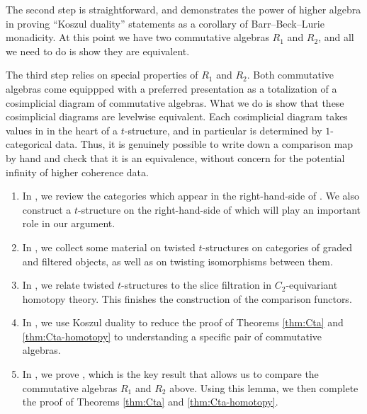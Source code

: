 The second step is straightforward, and demonstrates the power of higher algebra in proving ``Koszul duality'' statements as a corollary of Barr--Beck--Lurie monadicity. At this point we have two commutative algebras $R_1$ and $R_2$, and all we need to do is show they are equivalent.

The third step relies on special properties of $R_1$ and $R_2$.
Both commutative algebras come equippped with a preferred presentation as a totalization of a cosimplicial diagram of commutative algebras. What we do is show that these cosimplicial diagrams are levelwise equivalent. Each cosimplicial diagram takes values in in the heart of a $t$-structure, and in particular is determined by $1$-categorical data. Thus, it is genuinely possible to write down a comparison map by hand and check that it is an equivalence, without concern for the potential infinity of higher coherence data.


\begin{enumerate}
  \item In , we review the categories which appear in the right-hand-side of . We also construct a $t$-structure on the right-hand-side of  which will play an important role in our argument.
\item In , we collect some material on twisted $t$-structures on categories of graded and filtered objects, as well as on twisting isomorphisms between them.
\item In , we relate twisted $t$-structures to the slice filtration in $C_2$-equivariant homotopy theory. This finishes the construction of the comparison functors.
\item In , we use Koszul duality to reduce the proof of Theorems \ref{thm:Cta} and \ref{thm:Cta-homotopy} to understanding a specific pair of commutative algebras.
\item In , we prove , which is the key result that allows us to compare the commutative algebras $R_1$ and $R_2$ above. Using this lemma, we then complete the proof of Theorems \ref{thm:Cta} and \ref{thm:Cta-homotopy}.
\end{enumerate}


